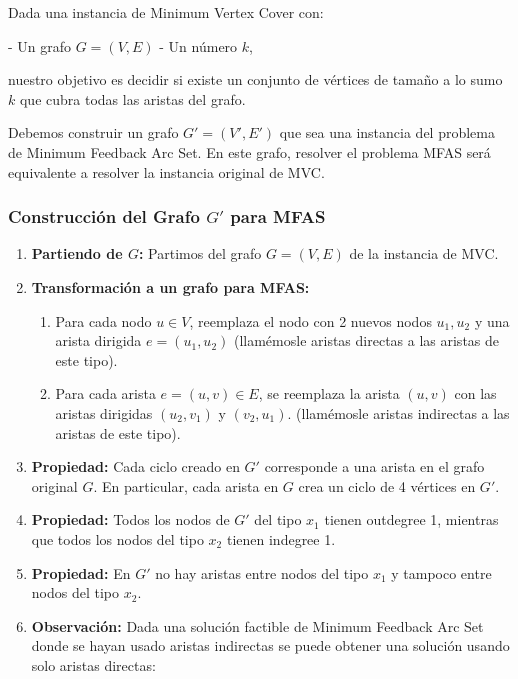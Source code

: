 \documentclass{article}
\begin{document}
Dada una instancia de Minimum Vertex Cover con:

- Un grafo $ G = (V, E) $
- Un número $ k $,

nuestro objetivo es decidir si existe un conjunto de vértices de tamaño a lo sumo $ k $ que cubra todas las aristas del grafo.

Debemos construir un grafo $ G' = (V', E') $ que sea una instancia del problema de Minimum Feedback Arc Set. En este grafo, resolver el problema MFAS será equivalente a resolver la instancia original de MVC.

\subsubsection{Construcción del Grafo $ G' $ para MFAS}

\begin{enumerate}
    \item \textbf{Partiendo de $G$:} Partimos del grafo $ G = (V, E) $ de la instancia de MVC.
    \item \textbf{Transformación a un grafo para MFAS:}
        \begin{enumerate}
            \item Para cada nodo $ u \in V $, reemplaza el nodo con 2 nuevos nodos $ u_1, u_2 $ y una arista dirigida $ e = (u_1, u_2) $ (llamémosle aristas directas a las aristas de este tipo).
            \item Para cada arista $ e = (u, v) \in E $, se reemplaza la arista $ (u, v) $ con las aristas dirigidas $ (u_2, v_1) $ y $ (v_2, u_1) $. (llamémosle aristas indirectas a las aristas de este tipo).
        \end{enumerate}
    \item \textbf{Propiedad:} Cada ciclo creado en $ G' $ corresponde a una arista en el grafo original $ G $. En particular, cada arista en $ G $ crea un ciclo de 4 vértices en $ G' $.
    \item \textbf{Propiedad:} Todos los nodos de $G'$ del tipo $x_1$ tienen outdegree 1, mientras que todos los nodos del tipo $x_2$ tienen indegree 1.
    \item \textbf{Propiedad:} En $G'$ no hay aristas entre nodos del tipo $x_1$ y tampoco entre nodos del tipo $x_2$.
    \item \textbf{Observación:} Dada una solución factible de Minimum Feedback Arc Set donde se hayan usado aristas indirectas se puede obtener una solución usando solo aristas directas:


\end{enumerate}
\end{document}
